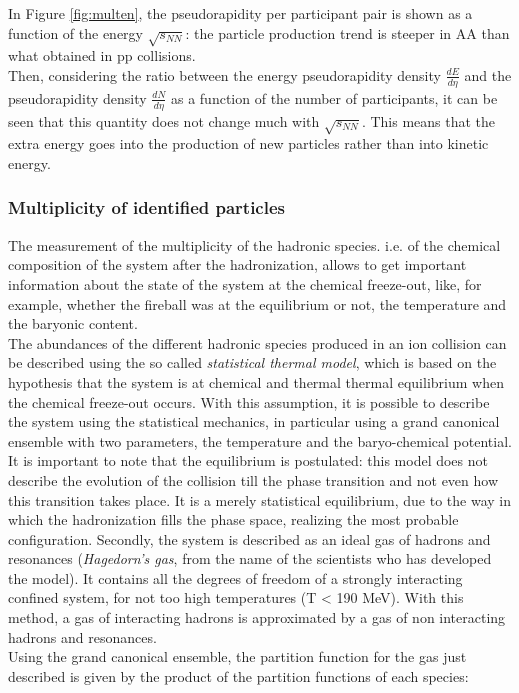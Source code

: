 %
In Figure \ref{fig:multen}, the pseudorapidity per participant pair is shown as a function of the energy $\sqrt{s_{NN}}$: the particle production trend is steeper in AA than what obtained in pp collisions.\\
Then, considering the ratio between the energy pseudorapidity density $\frac{dE}{d\eta}$ and  the pseudorapidity density $\frac{dN}{d\eta}$ as a function of the number of participants, it can be seen that this quantity does not change much with $\sqrt{s_{NN}}$. This means that the extra energy goes into the production of new particles rather than into kinetic energy.\\
\subsubsection{Multiplicity of identified particles}
The measurement of the multiplicity of the hadronic species. i.e. of the chemical composition of the system after the hadronization, allows to get important information about the state of the system at the chemical freeze-out, like, for example, whether the fireball was at the equilibrium or not, the temperature and the baryonic content.\\
The abundances of the different hadronic species produced in an ion collision can be described using the so called \textit{statistical thermal model}, which is based on the hypothesis that the system is at chemical and thermal thermal equilibrium when the chemical freeze-out occurs. With this assumption, it is possible to describe the system using the statistical mechanics, in particular using a grand canonical ensemble with two parameters, the temperature and the baryo-chemical potential. It is important to note that the equilibrium is postulated: this model does not describe the evolution of the collision till the phase transition and not even how this transition takes place. It is a merely statistical equilibrium, due to the way in which the hadronization fills the phase space, realizing the most probable configuration. Secondly, the system is described as an ideal gas of hadrons and resonances (\textit{Hagedorn's gas}, from the name of the scientists who has developed the model). It contains all the degrees of freedom of a strongly interacting confined system, for not too high temperatures (T < 190 MeV). With this method, a gas of interacting hadrons is approximated by a gas of non interacting hadrons and resonances.\\
Using the grand canonical ensemble, the partition function for the gas just described is given by the product of the partition functions of each species:
